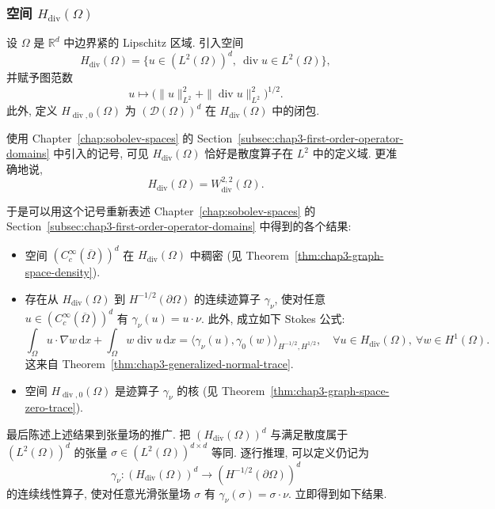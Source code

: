 \subsubsection{空间 $H_{\operatorname{div}}(\Omega)$}
\label{subsec:chap4-hdiv-space}

\begin{Definition}
\label{def:chap4-hdiv-space}
设 $\Omega$ 是 $\mathbb R^d$ 中边界紧的 Lipschitz 区域. 引入空间
\[
 H_{\operatorname{div}}(\Omega)
 =\{u\in(L^2(\Omega))^d,\ \operatorname{div}u\in L^2(\Omega)\},
\]
并赋予图范数
\[
 u\longmapsto
 \bigl(\|u\|_{L^2}^2+\|\operatorname{div}u\|_{L^2}^2\bigr)^{1/2}.
\]
此外, 定义 $H_{\operatorname{div},0}(\Omega)$ 为 $(\mathcal D(\Omega))^d$ 在 $H_{\operatorname{div}}(\Omega)$ 中的闭包.
\end{Definition}

使用 Chapter~\ref{chap:sobolev-spaces} 的 Section~\ref{subsec:chap3-first-order-operator-domains} 中引入的记号, 可见 $H_{\operatorname{div}}(\Omega)$ 恰好是散度算子在 $L^2$ 中的定义域. 更准确地说,
\[
 H_{\operatorname{div}}(\Omega)=W_{\operatorname{div}}^{2,2}(\Omega).
\]

于是可以用这个记号重新表述 Chapter~\ref{chap:sobolev-spaces} 的 Section~\ref{subsec:chap3-first-order-operator-domains} 中得到的各个结果:
\begin{itemize}
 \item 空间 $(C_c^\infty(\overline\Omega))^d$ 在 $H_{\operatorname{div}}(\Omega)$ 中稠密 (见 Theorem~\ref{thm:chap3-graph-space-density}).
 \item 存在从 $H_{\operatorname{div}}(\Omega)$ 到 $H^{-1/2}(\partial\Omega)$ 的连续迹算子 $\gamma_\nu$, 使对任意 $u\in(C_c^\infty(\overline\Omega))^d$ 有 $\gamma_\nu(u)=u\cdot\nu$. 此外, 成立如下 Stokes 公式:
 \begin{equation}
  \int_\Omega u\cdot\nabla w\,\mathrm dx
  +\int_\Omega w\operatorname{div}u\,\mathrm dx
  =\langle\gamma_\nu(u),\gamma_0(w)\rangle_{H^{-1/2},H^{1/2}},
  \quad\forall u\in H_{\operatorname{div}}(\Omega),\ \forall w\in H^1(\Omega).
  \label{eq:chap4-hdiv-stokes-formula}
 \end{equation}
 这来自 Theorem~\ref{thm:chap3-generalized-normal-trace}.
 \item 空间 $H_{\operatorname{div},0}(\Omega)$ 是迹算子 $\gamma_\nu$ 的核 (见 Theorem~\ref{thm:chap3-graph-space-zero-trace}).
\end{itemize}

最后陈述上述结果到张量场的推广. 把 $(H_{\operatorname{div}}(\Omega))^d$ 与满足散度属于 $(L^2(\Omega))^d$ 的张量 $\sigma\in(L^2(\Omega))^{d\times d}$ 等同. 逐行推理, 可以定义仍记为
\[
 \gamma_\nu:(H_{\operatorname{div}}(\Omega))^d
 \longrightarrow(H^{-1/2}(\partial\Omega))^d
\]
的连续线性算子, 使对任意光滑张量场 $\sigma$ 有 $\gamma_\nu(\sigma)=\sigma\cdot\nu$. 立即得到如下结果.

